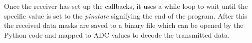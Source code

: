 \documentclass[../main.tex]{subfiles}
\begin{document}
Once the receiver has set up the callbacks, it uses a while loop to wait until the specific value is set to the \textit{pin\textunderscore state} signifying the end of the program.
After this the received data masks are saved to a binary file which can be opened by the Python code and mapped to ADC values to decode the transmitted data.
 
\end{document}
